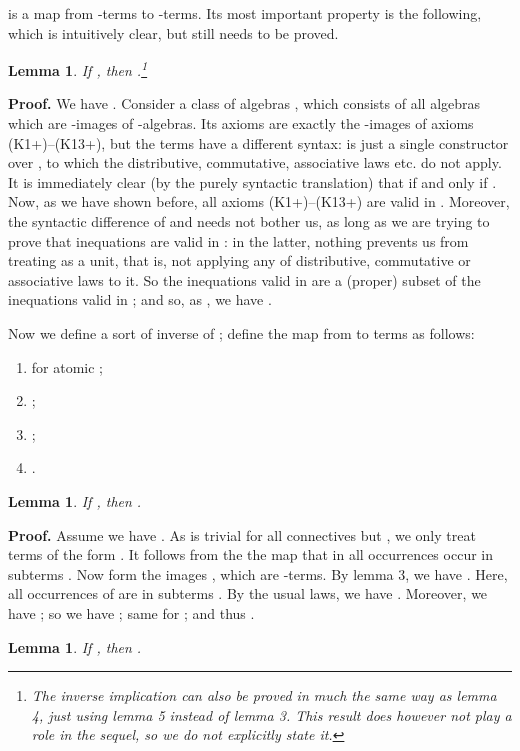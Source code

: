 \documentclass{eptcs}
\newtheorem{lem}[defn]{Lemma}
\newcommand{\proofbeg}{\textbf{Proof. }}
\newcommand{\proofend}{\hfill }
\begin{document}
 is a map from -terms to -terms. 
Its most important property is the following, which is
intuitively clear, but still needs to be proved.

\begin{lem}
If , then .\footnote{The inverse
implication can also be proved in much the same way as lemma 4, just using
lemma 5 instead of lemma 3. This result does however not play a 
role in the sequel, so we do not explicitly state it.}
\end{lem}

\proofbeg
We have .
Consider a class of algebras , which consists of all
algebras which are -images of -algebras. 
Its axioms are exactly the -images of
axioms (K1+)--(K13+), but the terms have a different syntax:
 is just a single constructor over , to which the distributive,
commutative, associative laws etc. do not apply. 
It is immediately clear
(by the purely syntactic translation) that 
 if and only if .
Now, as we have shown before, all axioms (K1+)--(K13+)
are valid in . Moreover, the syntactic difference
of  and  needs not bother us, as long as we are
trying to prove that  inequations are valid in
: in the latter, nothing prevents us from treating
 as a unit, that is, not applying any of distributive,
commutative or associative laws to it. So the inequations valid
in  are a (proper) subset of the inequations valid in
; and so, as , we have
.
\proofend

Now we define a sort of inverse of ; define the map
 from  to  terms as follows:
\begin{enumerate}
\item  for atomic ;
\item ;
\item ;
\item .
\end{enumerate}



\begin{lem}
If , then .
\end{lem}

\proofbeg
Assume we have . As  is trivial for all
connectives but , we only treat terms of the form . 
It follows from
the the map  that in  all occurrences  occur in 
subterms . Now form the images , which are
-terms. By lemma 3, we have
. Here, all occurrences of  are in subterms
. By the usual laws, we have
. Moreover, we have 
; so we have ; 
same for
; and thus .
\proofend

\begin{lem}
If , then .
\end{lem}
\end{document}
